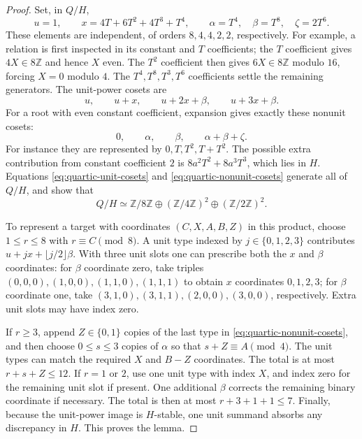 \documentclass[11pt]{amsart}
\theoremstyle{definition}
\numberwithin{equation}{section}
\begin{document}
\begin{proof}
Set, in $Q/H$,
\[
 u=1,\qquad x=4T+6T^2+4T^3+T^4,\qquad
 \alpha=T^4,\quad\beta=T^8,\quad\zeta=2T^6.
\]
These elements are independent, of orders $8,4,4,2,2$, respectively.
For example, a relation is first inspected in its constant and $T$
coefficients; the $T$ coefficient gives $4X\in8\mathbb Z$ and hence $X$ even.
The $T^2$ coefficient then gives $6X\in8\mathbb Z$ modulo $16$,
forcing $X=0$ modulo $4$.  The $T^4,T^8,T^3,T^6$ coefficients
settle the remaining generators.  The unit-power cosets are
\begin{equation}\label{eq:quartic-unit-cosets}
 u,\qquad u+x,\qquad u+2x+\beta,\qquad u+3x+\beta.
\end{equation}
For a root with even constant coefficient, expansion gives exactly
these nonunit cosets:
\begin{equation}\label{eq:quartic-nonunit-cosets}
 0,\qquad\alpha,\qquad\beta,\qquad\alpha+\beta+\zeta.
\end{equation}
For instance they are represented by $0,T,T^2,T+T^2$.
The possible extra contribution from constant coefficient $2$ is
$8a^2T^2+8a^3T^3$, which lies in $H$.
Equations \eqref{eq:quartic-unit-cosets} and
\eqref{eq:quartic-nonunit-cosets} generate all of $Q/H$, and show that
\[
 Q/H\simeq\mathbb Z/8\mathbb Z\oplus
 (\mathbb Z/4\mathbb Z)^2\oplus(\mathbb Z/2\mathbb Z)^2.
\]

To represent a target with coordinates $(C,X,A,B,Z)$ in this product,
choose $1\le r\le8$ with $r\equiv C\pmod8$.  A unit type indexed by
$j\in\{0,1,2,3\}$ contributes
$u+jx+\lfloor j/2\rfloor\beta$.  With three unit slots one can
prescribe both the $x$ and $\beta$ coordinates: for $\beta$ coordinate
zero, take triples $(0,0,0),(1,0,0),(1,1,0),(1,1,1)$ to obtain
$x$ coordinates $0,1,2,3$; for $\beta$ coordinate one, take
$(3,1,0),(3,1,1),(2,0,0),(3,0,0)$, respectively.
Extra unit slots may have index zero.

If $r\ge3$, append $Z\in\{0,1\}$ copies of the last type in
\eqref{eq:quartic-nonunit-cosets}, and then choose
$0\le s\le3$ copies of $\alpha$ so that $s+Z\equiv A\pmod4$.
The unit types can match the required $X$ and $B-Z$ coordinates.
The total is at most $r+s+Z\le12$.
If $r=1$ or $2$, use one unit type with index $X$, and index zero
for the remaining unit slot if present.  One additional $\beta$
corrects the remaining binary coordinate if necessary.  The total
is then at most $r+3+1+1\le7$.
Finally, because the unit-power image is $H$-stable, one unit
summand absorbs any discrepancy in $H$.  This proves the lemma.
\end{proof}
\end{document}
